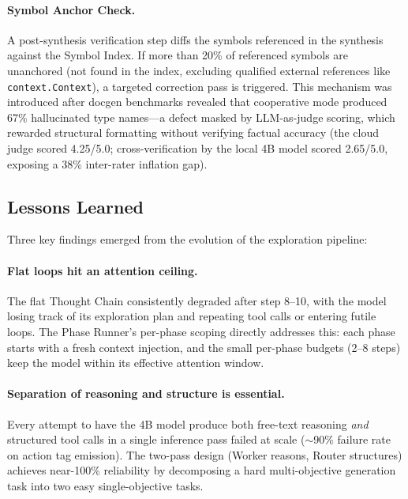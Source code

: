 \documentclass{article}
\begin{document}
\paragraph{Symbol Anchor Check.}
A post-synthesis verification step diffs the symbols referenced in the synthesis against the Symbol Index.
If more than 20\% of referenced symbols are unanchored (not found in the index, excluding qualified external references like \texttt{context.Context}), a targeted correction pass is triggered.
This mechanism was introduced after docgen benchmarks revealed that cooperative mode produced 67\% hallucinated type names---a defect masked by LLM-as-judge scoring, which rewarded structural formatting without verifying factual accuracy (the cloud judge scored 4.25/5.0; cross-verification by the local 4B model scored 2.65/5.0, exposing a 38\% inter-rater inflation gap).

\subsection{Lessons Learned}
\label{sec:exploration_lessons}

Three key findings emerged from the evolution of the exploration pipeline:

\paragraph{Flat loops hit an attention ceiling.}
The flat Thought Chain consistently degraded after step 8--10, with the model losing track of its exploration plan and repeating tool calls or entering futile loops.
The Phase Runner's per-phase scoping directly addresses this: each phase starts with a fresh context injection, and the small per-phase budgets (2--8 steps) keep the model within its effective attention window.

\paragraph{Separation of reasoning and structure is essential.}
Every attempt to have the 4B model produce both free-text reasoning \emph{and} structured tool calls in a single inference pass failed at scale ($\sim$90\% failure rate on action tag emission).
The two-pass design (Worker reasons, Router structures) achieves near-100\% reliability by decomposing a hard multi-objective generation task into two easy single-objective tasks.
\end{document}
